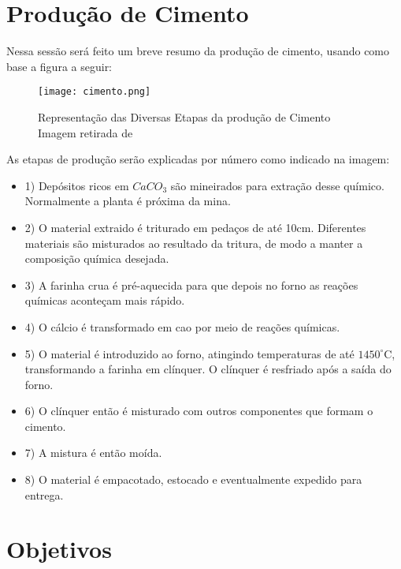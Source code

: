 \section{Produção de Cimento}
\label{sec:producao}

Nessa sessão será feito um breve resumo da produção de cimento, usando como base a figura a seguir: \\ 

\begin{figure}[H]
\centering
\texttt{[image: cimento.png]}
\caption{Representação das Diversas Etapas da produção de Cimento \\ Imagem retirada de \citet{cementroadmap}}
\end{figure}


As etapas de produção serão explicadas por número como indicado na imagem: \\

\begin{itemize}

\item[] 1) Depósitos ricos em $CaCO_3$ são mineirados para extração desse químico. Normalmente a planta é próxima da mina.
\item[] 2) O material extraido é triturado em pedaços de até 10cm. Diferentes materiais são misturados ao resultado da tritura, de modo a manter a composição química desejada. 
\item[] 3) A farinha crua é pré-aquecida para que depois no forno as reações químicas aconteçam mais rápido. 
\item[] 4) O cálcio é transformado em cao por meio de reações químicas.  
\item[] 5) O material é introduzido ao forno, atingindo temperaturas de até $1450^\circ$C, transformando a farinha em clínquer. O clínquer é resfriado após a saída do forno. 
\item[] 6) O clínquer então é misturado com outros componentes que formam o cimento.
\item[] 7) A mistura é então moída.
\item[] 8) O material é empacotado, estocado e eventualmente expedido para entrega.

\end{itemize}


\section{Objetivos}
\label{sec:objetivo}

